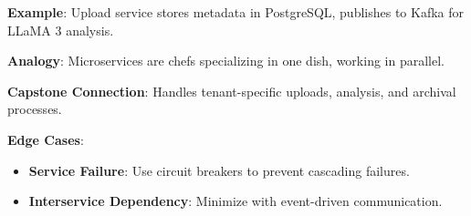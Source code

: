 \documentclass[11pt]{article}
\begin{document}
\begin{glossaryterm}
\textbf{Example}: Upload service stores metadata in PostgreSQL, publishes to Kafka for LLaMA 3 analysis.

\textbf{Analogy}: Microservices are chefs specializing in one dish, working in parallel.

\textbf{Capstone Connection}: Handles tenant-specific uploads, analysis, and archival processes.

\textbf{Edge Cases}:
\begin{itemize}
    \item \textbf{Service Failure}: Use circuit breakers to prevent cascading failures.
    \item \textbf{Interservice Dependency}: Minimize with event-driven communication.
\end{itemize}
\end{glossaryterm}
\end{document}
